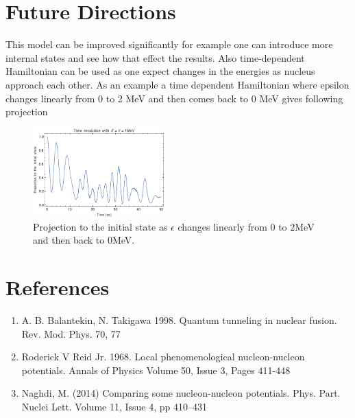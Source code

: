 \documentclass[a4paper,two column]{article}
\begin{document}
        \section{Future Directions}
            This model can be improved significantly for example one can introduce more internal states and see how that effect the results. Also time-dependent Hamiltonian can be used as one expect changes in the energies as nucleus approach each other. As an example a time dependent Hamiltonian where epsilon changes linearly from 0 to 2 MeV and then comes back to 0 MeV gives following projection
            \begin{figure}[H]
                \centering
                \includegraphics[width=0.45\textwidth,fbox]{image/changeepsilonlin2v1d1}
                \caption{Projection to the initial state as $\epsilon$ changes linearly from 0 to 2MeV and then back to 0MeV.}
                \label{fig:timedependentlin}
            \end{figure}
        \section{References}\label{References}
            \begin{enumerate}
                \item A. B. Balantekin, N. Takigawa 1998. Quantum tunneling in nuclear fusion. Rev. Mod. Phys. 70, 77 \label{ref:nuclearfusion}
                \item Roderick V Reid Jr. 1968. Local phenomenological nucleon-nucleon potentials. Annals of Physics
                Volume 50, Issue 3, Pages 411-448 \label{ref:reid}
                \item Naghdi, M. (2014) Comparing some nucleon-nucleon potentials. Phys. Part. Nuclei Lett. Volume 11, Issue 4, pp 410–431 \label{ref:nuclearpotential}
            \end{enumerate}
    
\end{document}
